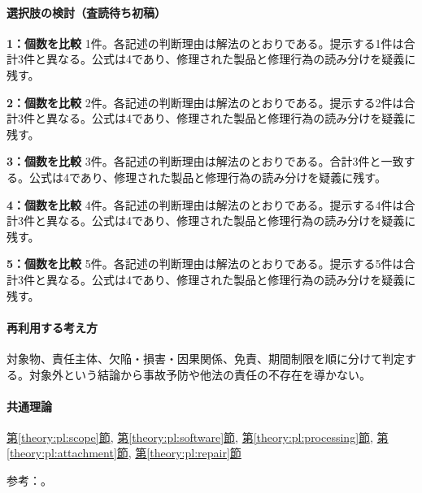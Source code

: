 \paragraph{選択肢の検討（査読待ち初稿）}\mbox{}\par

\noindent\textbf{1：個数を比較} 1件。各記述の判断理由は解法のとおりである。提示する1件は合計3件と異なる。公式は4であり、修理された製品と修理行為の読み分けを疑義に残す。\par

\noindent\textbf{2：個数を比較} 2件。各記述の判断理由は解法のとおりである。提示する2件は合計3件と異なる。公式は4であり、修理された製品と修理行為の読み分けを疑義に残す。\par

\noindent\textbf{3：個数を比較} 3件。各記述の判断理由は解法のとおりである。合計3件と一致する。公式は4であり、修理された製品と修理行為の読み分けを疑義に残す。\par

\noindent\textbf{4：個数を比較} 4件。各記述の判断理由は解法のとおりである。提示する4件は合計3件と異なる。公式は4であり、修理された製品と修理行為の読み分けを疑義に残す。\par

\noindent\textbf{5：個数を比較} 5件。各記述の判断理由は解法のとおりである。提示する5件は合計3件と異なる。公式は4であり、修理された製品と修理行為の読み分けを疑義に残す。\par

\paragraph{再利用する考え方} 対象物、責任主体、欠陥・損害・因果関係、免責、期間制限を順に分けて判定する。対象外という結論から事故予防や他法の責任の不存在を導かない。

\paragraph{共通理論} \hyperref[theory:pl:scope]{第\ref*{theory:pl:scope}節}, \hyperref[theory:pl:software]{第\ref*{theory:pl:software}節}, \hyperref[theory:pl:processing]{第\ref*{theory:pl:processing}節}, \hyperref[theory:pl:attachment]{第\ref*{theory:pl:attachment}節}, \hyperref[theory:pl:repair]{第\ref*{theory:pl:repair}節}

\par 参考：\cite{pl_statute,pl_qa,pl_definitions2018}。

